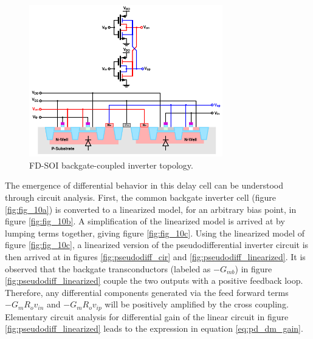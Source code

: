 		\begin{figure}[htb!]
		        \centering
		        \includegraphics[width=0.75\textwidth, angle=0]{./figs/design/pseudodiff_inv_xsection}
		    \caption{FD-SOI backgate-coupled inverter topology.}
		    \label{fig:bg_inv_jacqu}
		\end{figure}	

		The emergence of differential behavior in this delay cell can be understood through circuit analysis. First, the common backgate inverter cell (figure \ref{fig:fig_10a}) is converted to a linearized model, for an arbitrary bias point, in figure \ref{fig:fig_10b}. A simplification of the linearized model is arrived at by lumping terms together, giving figure \ref{fig:fig_10c}. Using the linearized model of figure \ref{fig:fig_10c}, a linearized version of the pseudodifferential inverter circuit is then arrived at in figures \ref{fig:pseudodiff_cir} and \ref{fig:pseudodiff_linearized}. It is observed that the backgate transconductors (labeled as $-G_{mb}$) in figure \ref{fig:pseudodiff_linearized} couple the two outputs with a positive feedback loop. Therefore, any differential components generated via the feed forward terms $-G_m R_o v_{in}$ and $-G_m R_o v_{ip}$ will be positively amplified by the cross coupling. Elementary circuit analysis for differential gain of the linear circuit in figure \ref{fig:pseudodiff_linearized} leads to the expression in equation \ref{eq:pd_dm_gain}.

